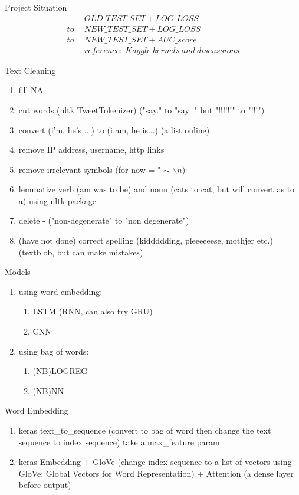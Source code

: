 \documentclass{beamer}
\begin{document}
\begin{frame}{Project Situation}
\begin{align*}
&OLD\_TEST\_SET + LOG\_LOSS\\to\ \ &NEW\_TEST\_SET + LOG\_LOSS\\to\ \ &NEW\_TEST\_SET + AUC\_score\\
&reference:\ Kaggle\ kernels\ and\ discussions
\end{align*}
\end{frame}

\begin{frame}{Text Cleaning}
\begin{enumerate}
	\item fill NA
	\item cut words (nltk TweetTokenizer) ("say." to "say ." but "!!!!!!" to "!!!")
	\item convert (i'm, he's ...) to (i am, he is...) (a list online)
	\item remove IP address, username, http links
	\item remove irrelevant symbols (for now = " $\sim$ $\backslash n$)
	\item lemmatize verb (am was to be) and noun (cats to cat, but will convert as to a) using nltk package
	\item delete - ("non-degenerate" to "non degenerate")
	\item (have not done) correct spelling (kiddddding, pleeeeeese, mothjer etc.) (textblob, but can make mistakes)
\end{enumerate}
\end{frame}

\begin{frame}{Models}
\begin{enumerate}
	\item using word embedding:\begin{enumerate}
	\item LSTM (RNN, can also try GRU)
	\item CNN
	\end{enumerate}
	\item using bag of words:\begin{enumerate}
	\item (NB)LOGREG
	\item (NB)NN
	\end{enumerate}
\end{enumerate}
\end{frame}

\begin{frame}{Word Embedding}
\begin{enumerate}
	\item keras text\_to\_sequence (convert to bag of word then change the text sequence to index sequence) take a max\_feature param
	\item keras Embedding + GloVe (change index sequence to a list of vectors using GloVe: Global Vectors for Word Representation) + Attention (a dense layer before output)
\end{enumerate}
\end{frame}
\end{document}
